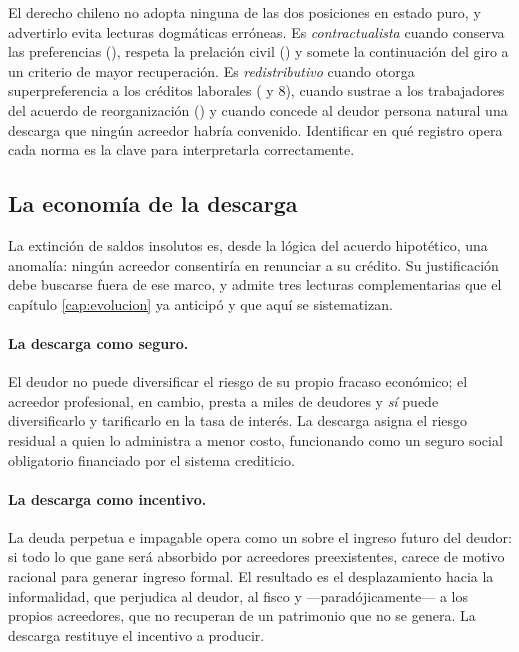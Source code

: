 \begin{alerta}
El derecho chileno no adopta ninguna de las dos posiciones en estado puro, y advertirlo evita
lecturas dogmáticas erróneas. Es \emph{contractualista} cuando conserva las preferencias
(), respeta la prelación civil () y somete la continuación del giro a un criterio
de mayor recuperación. Es \emph{redistributivo} cuando otorga superpreferencia a los créditos
laborales (  y 8), cuando sustrae a los trabajadores del acuerdo de
reorganización () y cuando concede al deudor persona natural una descarga que ningún
acreedor habría convenido. Identificar en qué registro opera cada norma es la clave para
interpretarla correctamente.
\end{alerta}

\bloqueNormativo

\subsection{La economía de la descarga}

La extinción de saldos insolutos es, desde la lógica del acuerdo hipotético, una anomalía: ningún
acreedor consentiría en renunciar a su crédito. Su justificación debe buscarse fuera de ese marco,
y admite tres lecturas complementarias que el capítulo \ref{cap:evolucion} ya anticipó y que aquí
se sistematizan.

\paragraph{La descarga como seguro.} El deudor no puede diversificar el riesgo de su propio fracaso
económico; el acreedor profesional, en cambio, presta a miles de deudores y \emph{sí} puede
diversificarlo y tarificarlo en la tasa de interés. La descarga asigna el riesgo residual a quien
lo administra a menor costo, funcionando como un seguro social obligatorio financiado por el
sistema crediticio.

\paragraph{La descarga como incentivo.} La deuda perpetua e impagable opera como un
 sobre el ingreso futuro del deudor: si todo lo que
gane será absorbido por acreedores preexistentes, carece de motivo racional para generar ingreso
formal. El resultado es el desplazamiento hacia la informalidad, que perjudica al deudor, al fisco
y ---paradójicamente--- a los propios acreedores, que no recuperan de un patrimonio que no se
genera. La descarga restituye el incentivo a producir.

